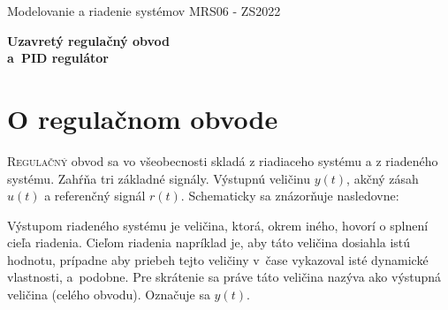\documentclass[a4paper, 10pt, ]{article}
\def\oznacenieCasti{MRS06 - ZS2022}
\begin{document}
\lstset{%
style=mystyle,
rangebeginprefix=\#\#\#\ cellB\ ,%
rangebeginsuffix=\ \#\#\#,%
rangeendprefix=\#\#\#\ cellE\ ,%
rangeendsuffix=\ \#\#\#,%
includerangemarker=false,
}




\fontsize{12pt}{22pt}\selectfont

\centerline{\textsf{Modelovanie a riadenie systémov} \hfill \textsf{\oznacenieCasti}}

\fontsize{18pt}{22pt}\selectfont





\begin{flushleft}
	\textbf{\textsf{Uzavretý regulačný obvod\\a~PID regulátor}}
\end{flushleft}





\normalsize

\bigskip

{\hypersetup{hidelinks}

\tableofcontents

}

\bigskip

\vspace{18pt}



\section{O regulačnom obvode}

\lettrine[lines=3, nindent=0pt]{R}{egulačný}
obvod sa vo všeobecnosti skladá z riadiaceho systému a z riadeného systému. Zahŕňa tri základné signály. Výstupnú veličinu $y(t)$, akčný zásah $u(t)$ a referenčný signál $r(t)$. Schematicky sa znázorňuje nasledovne:

\begin{center}


	\label{schURO_vseob.pdf}

\end{center}


Výstupom riadeného systému je veličina, ktorá, okrem iného, hovorí o splnení cieľa riadenia. Cieľom riadenia napríklad je, aby táto veličina dosiahla istú hodnotu, prípadne aby priebeh tejto veličiny v~čase vykazoval isté dynamické vlastnosti, a~podobne. Pre skrátenie sa práve táto veličina nazýva ako výstupná veličina (celého obvodu). Označuje sa $y(t)$.
\end{document}
